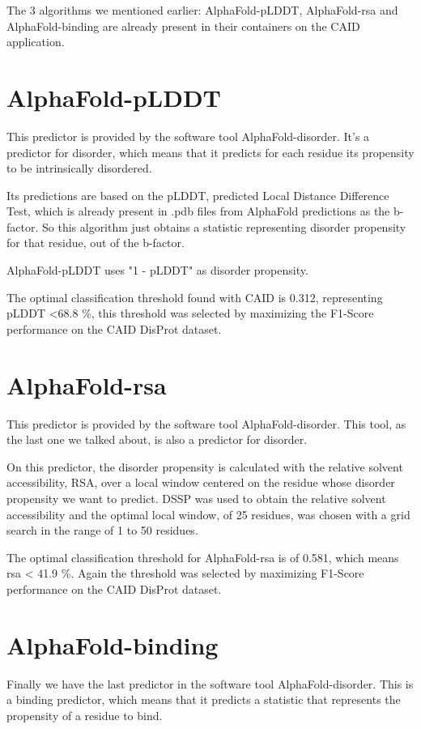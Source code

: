 The 3 algorithms we mentioned earlier: AlphaFold-pLDDT, AlphaFold-rsa and AlphaFold-binding are already present in their containers on the CAID application.

\section{AlphaFold-pLDDT}
This predictor is provided by the software tool AlphaFold-disorder. It's a predictor for disorder, which means that it predicts for each residue its propensity to be intrinsically disordered.

Its predictions are based on the pLDDT, predicted Local Distance Difference Test, which is already present in .pdb files from AlphaFold predictions as the b-factor. So this algorithm just obtains a statistic representing disorder propensity for that residue, out of the b-factor.

AlphaFold-pLDDT uses "1 - pLDDT" as disorder propensity. 

The optimal classification threshold found with CAID is 0.312, representing pLDDT <68.8 \%, this threshold was selected by maximizing the F1-Score performance on the CAID DisProt dataset.
\section{AlphaFold-rsa}
This predictor is provided by the software tool AlphaFold-disorder. This tool, as the last one we talked about, is also a predictor for disorder.

On this predictor, the disorder propensity is calculated with the relative solvent accessibility, RSA, over a local window centered on the residue whose disorder propensity we want to predict. DSSP was used to obtain the relative solvent accessibility and the optimal local window, of 25 residues, was chosen with a grid search in the range of 1 to 50 residues.

The optimal classification threshold for AlphaFold-rsa is of 0.581, which means rsa < 41.9 \%. Again the threshold was selected by maximizing F1-Score performance on the CAID DisProt dataset.

\section{AlphaFold-binding}
Finally we have the last predictor in the software tool AlphaFold-disorder. This is a binding predictor, which means that it predicts a statistic that represents the propensity of a residue to bind.

